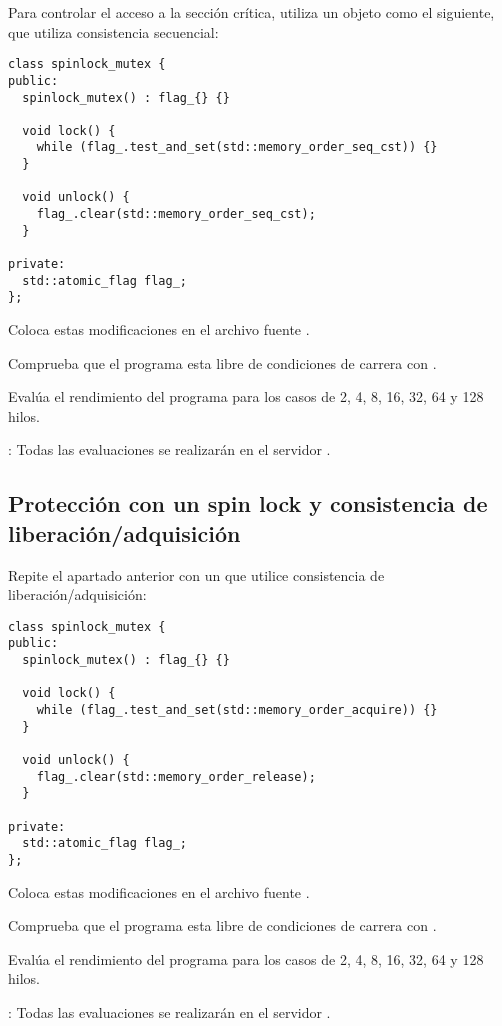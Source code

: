 Para controlar el acceso a la sección crítica, utiliza un objeto  como el siguiente,
que utiliza consistencia secuencial:
\begin{lstlisting}
class spinlock_mutex {
public:
  spinlock_mutex() : flag_{} {}

  void lock() {
    while (flag_.test_and_set(std::memory_order_seq_cst)) {}
  }

  void unlock() {
    flag_.clear(std::memory_order_seq_cst);
  }

private:
  std::atomic_flag flag_;
};
\end{lstlisting}

Coloca estas modificaciones en el archivo fuente .

Comprueba que el programa esta libre de condiciones de carrera con .

Evalúa el rendimiento del programa para los casos de 2, 4, 8, 16, 32, 64 y 128 hilos.

: Todas las evaluaciones se realizarán en el servidor .

\subsection{Protección con un spin lock y consistencia de liberación/adquisición}

Repite el apartado anterior con un  que utilice consistencia de
liberación/adquisición:

\begin{lstlisting}
class spinlock_mutex {
public:
  spinlock_mutex() : flag_{} {}

  void lock() {
    while (flag_.test_and_set(std::memory_order_acquire)) {}
  }

  void unlock() {
    flag_.clear(std::memory_order_release);
  }

private:
  std::atomic_flag flag_;
};
\end{lstlisting}

Coloca estas modificaciones en el archivo fuente .

Comprueba que el programa esta libre de condiciones de carrera con .

Evalúa el rendimiento del programa para los casos de 2, 4, 8, 16, 32, 64 y 128 hilos.

: Todas las evaluaciones se realizarán en el servidor .

